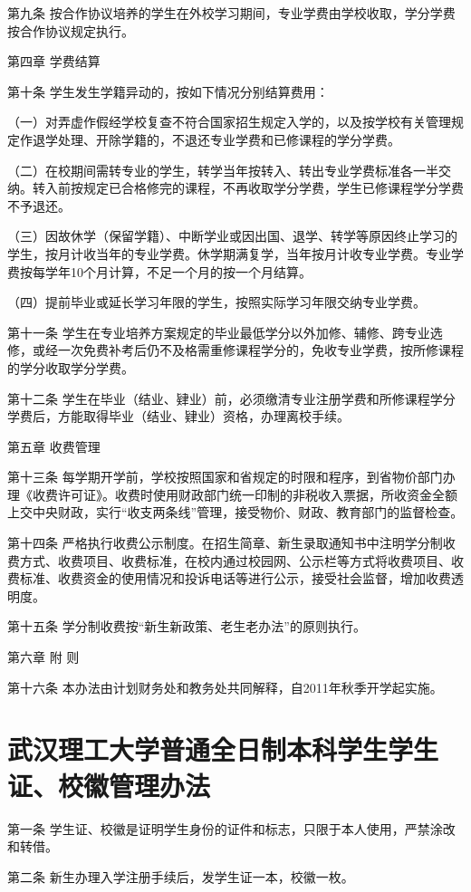 \documentclass[UTF8,12pt,a4paper]{report}
\begin{document}
第九条 按合作协议培养的学生在外校学习期间，专业学费由学校收取，学分学费按合作协议规定执行。

第四章  学费结算

第十条 学生发生学籍异动的，按如下情况分别结算费用：

（一）对弄虚作假经学校复查不符合国家招生规定入学的，以及按学校有关管理规定作退学处理、开除学籍的，不退还专业学费和已修课程的学分学费。

（二）在校期间需转专业的学生，转学当年按转入、转出专业学费标准各一半交纳。转入前按规定已合格修完的课程，不再收取学分学费，学生已修课程学分学费不予退还。

（三）因故休学（保留学籍）、中断学业或因出国、退学、转学等原因终止学习的学生，按月计收当年的专业学费。休学期满复学，当年按月计收专业学费。专业学费按每学年10个月计算，不足一个月的按一个月结算。

（四）提前毕业或延长学习年限的学生，按照实际学习年限交纳专业学费。

第十一条 学生在专业培养方案规定的毕业最低学分以外加修、辅修、跨专业选修，或经一次免费补考后仍不及格需重修课程学分的，免收专业学费，按所修课程的学分收取学分学费。

第十二条 学生在毕业（结业、肄业）前，必须缴清专业注册学费和所修课程学分学费后，方能取得毕业（结业、肄业）资格，办理离校手续。

第五章 收费管理

第十三条 每学期开学前，学校按照国家和省规定的时限和程序，到省物价部门办理《收费许可证》。收费时使用财政部门统一印制的非税收入票据，所收资金全额上交中央财政，实行“收支两条线”管理，接受物价、财政、教育部门的监督检查。

第十四条 严格执行收费公示制度。在招生简章、新生录取通知书中注明学分制收费方式、收费项目、收费标准，在校内通过校园网、公示栏等方式将收费项目、收费标准、收费资金的使用情况和投诉电话等进行公示，接受社会监督，增加收费透明度。

第十五条 学分制收费按“新生新政策、老生老办法”的原则执行。

第六章 附 则

第十六条 本办法由计划财务处和教务处共同解释，自2011年秋季开学起实施。

\chapter{武汉理工大学普通全日制本科学生学生证、校徽管理办法}
第一条 学生证、校徽是证明学生身份的证件和标志，只限于本人使用，严禁涂改和转借。

第二条 新生办理入学注册手续后，发学生证一本，校徽一枚。
\end{document}
